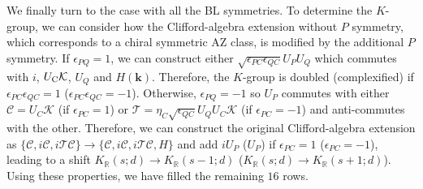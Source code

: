 \documentclass{tADP2e}
\theoremstyle{plain}
\theoremstyle{plain}
\theoremstyle{definition}
\begin{document}
\begin{appendices}
We finally turn to the case with all the BL symmetries. To determine the $K$-group, we can consider how the Clifford-algebra extension without $P$ symmetry, which corresponds to a chiral symmetric AZ class, is modified by the additional $P$ symmetry. If $\epsilon_{PQ}=1$, we can construct either $\sqrt{\epsilon_{PC}\epsilon_{QC}}U_PU_Q$ which commutes with $i$, $U_{\rm C}\mathcal{K}$, $U_Q$ and $H(\boldsymbol{k})$. Therefore, the $K$-group is doubled (complexified) if $\epsilon_{PC}\epsilon_{QC}=1$ ($\epsilon_{PC}\epsilon_{QC}=-1$). Otherwise, $\epsilon_{PQ}=-1$ so $U_P$ commutes with either $\mathcal{C}=U_C\mathcal{K}$ (if $\epsilon_{PC}=1$) or $\mathcal{T}=\eta_C\sqrt{\epsilon_{QC}}U_QU_C\mathcal{K}$ (if $\epsilon_{PC}=-1$) and anti-commutes with the other.  Therefore, we can construct the original Clifford-algebra extension as $\{\mathcal{C},i\mathcal{C},i\mathcal{T}\mathcal{C}\}\to\{\mathcal{C},i\mathcal{C},i\mathcal{T}\mathcal{C},H\}$ and add $iU_P$ ($U_P$) if $\epsilon_{PC}=1$ ($\epsilon_{PC}=-1$), %
leading to a shift $K_{\mathbb{R}}(s;d)\to K_{\mathbb{R}}(s-1;d)$ ($K_{\mathbb{R}}(s;d)\to K_{\mathbb{R}}(s+1;d)$). Using these properties, we have filled the remaining $16$ rows.





\end{appendices}
\end{document}
